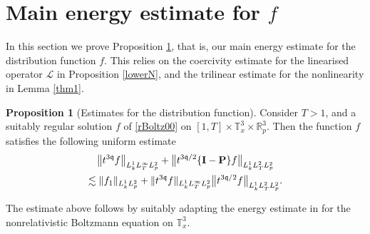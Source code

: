 \documentclass[reqno]{amsart}
\newcommand{\pv}{p}
\def\norm#1{\big\Vert#1\big\Vert}
\newcommand{\qq}{\mathfrak{q}}
\newcommand{\tTq}{t^{3\qq}}
\newcommand{\linL}{\mathcal{L}}
\newcommand{\micro}{{\bf \{I- P\}}}
\newcommand{\T}{\mathbb{T}}
\theoremstyle{definition}
\newtheorem{proposition}[theorem]{Proposition}
\numberwithin{equation}{section}
\numberwithin{theorem}{section}
\begin{document}
\section{Main energy estimate for \texorpdfstring{\(f\)}{}}\label{sectionWienernorm}



In this section we prove Proposition \ref{Torus Boltzmann Micro}, that is, our main energy estimate for the distribution function \(f\). This relies on the coercivity estimate for the linearised operator \(\linL\) in Proposition \ref{lowerN}, and the trilinear estimate for the nonlinearity in Lemma \ref{thm1}. 



\begin{proposition}[Estimates for the distribution function]\label{Torus Boltzmann Micro}
Consider \(T>1\), and a suitably regular solution \(f\) of \eqref{rBoltz00} on \([1,T]\times \mathbb{T}^3_x\times \mathbb{R}^3_p\). Then the function \(f\) satisfies the following uniform estimate
\begin{multline}
\norm{\tTq f}_{L^1_kL^\infty_TL^2_{\pv}}
+
{\norm{t^{3\qq/2}\micro f}_{L^1_kL^2_TL^2_{\pv}}}
\\
\lesssim 
\Vert {f}_1\Vert_{L^1_kL^2_{\pv}}
+{\Vert{\tTq f}\Vert_{L^1_kL^\infty_TL^2_{\pv}}} {\norm{t^{3\qq/2} f}_{L^1_kL^2_TL^2_{\pv}}}.
\label{est.fRHS}
\end{multline}
\end{proposition}

The estimate above follows by suitably adapting the energy estimate in \cite[Section 3]{1904.12086} for the nonrelativistic Boltzmann equation on \(\T^3_x\).
\end{document}
